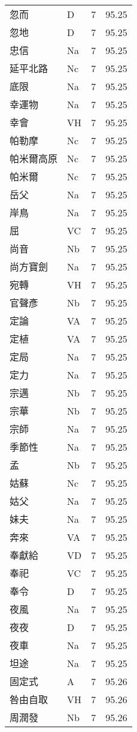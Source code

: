 \documentclass[twocolumn]{book}
\begin{document}
\begin{supertabular}{llrr}
忽而 & D & 7 &  95.25\\
忽地 & D & 7 &  95.25\\
忠信 & Na & 7 &  95.25\\
延平北路 & Nc & 7 &  95.25\\
底限 & Na & 7 &  95.25\\
幸運物 & Na & 7 &  95.25\\
幸會 & VH & 7 &  95.25\\
帕勒摩 & Nc & 7 &  95.25\\
帕米爾高原 & Nc & 7 &  95.25\\
帕米爾 & Nc & 7 &  95.25\\
岳父 & Na & 7 &  95.25\\
岸鳥 & Na & 7 &  95.25\\
屈 & VC & 7 &  95.25\\
尚音 & Nb & 7 &  95.25\\
尚方寶劍 & Na & 7 &  95.25\\
宛轉 & VH & 7 &  95.25\\
官聲彥 & Nb & 7 &  95.25\\
定論 & VA & 7 &  95.25\\
定植 & VA & 7 &  95.25\\
定局 & Na & 7 &  95.25\\
定力 & Na & 7 &  95.25\\
宗邁 & Nb & 7 &  95.25\\
宗華 & Nb & 7 &  95.25\\
宗師 & Na & 7 &  95.25\\
季節性 & Na & 7 &  95.25\\
孟 & Nb & 7 &  95.25\\
姑蘇 & Nc & 7 &  95.25\\
姑父 & Na & 7 &  95.25\\
妹夫 & Na & 7 &  95.25\\
奔來 & VA & 7 &  95.25\\
奉獻給 & VD & 7 &  95.25\\
奉祀 & VC & 7 &  95.25\\
奉令 & D & 7 &  95.25\\
夜風 & Na & 7 &  95.25\\
夜夜 & D & 7 &  95.25\\
夜車 & Na & 7 &  95.25\\
坦途 & Na & 7 &  95.25\\
固定式 & A & 7 &  95.26\\
咎由自取 & VH & 7 &  95.26\\
周潤發 & Nb & 7 &  95.26\\

\end{supertabular}
\end{document}
